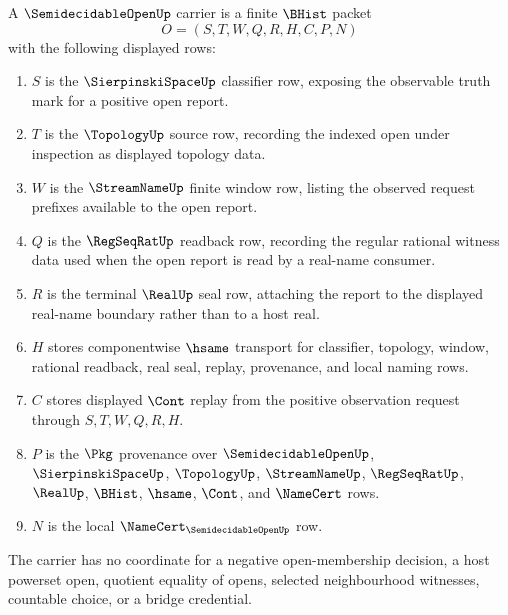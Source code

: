 \begin{definition}
\label{def:semidecidable-open-carrier}
A $\SemidecidableOpenUp$ carrier is a finite $\BHist$ packet
$$
O=(S,T,W,Q,R,H,C,P,N)
$$
with the following displayed rows:
\begin{enumerate}
\item $S$ is the $\SierpinskiSpaceUp$ classifier row, exposing the observable truth mark for a positive open report.
\item $T$ is the $\TopologyUp$ source row, recording the indexed open under inspection as displayed topology data.
\item $W$ is the $\StreamNameUp$ finite window row, listing the observed request prefixes available to the open report.
\item $Q$ is the $\RegSeqRatUp$ readback row, recording the regular rational witness data used when the open report is read by a real-name consumer.
\item $R$ is the terminal $\RealUp$ seal row, attaching the report to the displayed real-name boundary rather than to a host real.
\item $H$ stores componentwise $\hsame$ transport for classifier, topology, window, rational readback, real seal, replay, provenance, and local naming rows.
\item $C$ stores displayed $\Cont$ replay from the positive observation request through $S,T,W,Q,R,H$.
\item $P$ is the $\Pkg$ provenance over $\SemidecidableOpenUp$, $\SierpinskiSpaceUp$, $\TopologyUp$, $\StreamNameUp$, $\RegSeqRatUp$, $\RealUp$, $\BHist$, $\hsame$, $\Cont$, and $\NameCert$ rows.
\item $N$ is the local $\NameCert_{\SemidecidableOpenUp}$ row.
\end{enumerate}
The carrier has no coordinate for a negative open-membership decision, a host powerset open, quotient equality of opens, selected neighbourhood witnesses, countable choice, or a bridge credential.
\end{definition}


